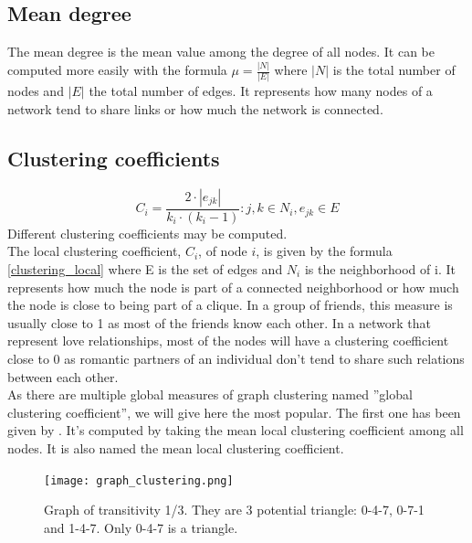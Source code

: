 \documentclass[a4paper, 12pt]{report}
\begin{document}
\subsection{Mean degree}
The mean degree is the mean value among the degree of all nodes. It can be computed more easily with the formula $\mu = \frac{|N|}{|E|}$ where $|N|$ is the total number of nodes and $|E|$ the total number of edges. It represents how many nodes of a network tend to share links or how much the network is connected.

\subsection{Clustering coefficients}
\begin{equation}
C_i = \frac{2 \cdot |e_{jk}|}{k_i \cdot (k_i - 1)}: j, k \in N_i, e_{jk} \in E
\label{clustering_local}
\end{equation}
Different clustering coefficients may be computed.\\
The local clustering coefficient, $C_i$, of node $i$, is given by the formula \ref{clustering_local} where E is the set of edges and $N_i$ is the neighborhood of i. It represents how much the node is part of a connected neighborhood or how much the node is close to being part of a clique. In a group of friends, this measure is usually close to 1 as most of the friends know each other. In a network that represent love relationships, most of the nodes will have a clustering coefficient close to 0 as romantic partners of an individual don't tend to share such relations between each other.\\

As there are multiple global measures of graph clustering named ''global clustering coefficient'', we will give here the most popular. The first one has been given by \cite{globalClustering1}. It's computed by taking the mean local clustering coefficient among all nodes. It is also named the mean local clustering coefficient. \\

\begin{figure}
\centering
\texttt{[image: graph\_clustering.png]}
\caption{Graph of transitivity 1/3. They are 3 potential triangle: 0-4-7, 0-7-1 and 1-4-7. Only 0-4-7 is a triangle. }
\label{transitivity}
\end{figure}
\end{document}
